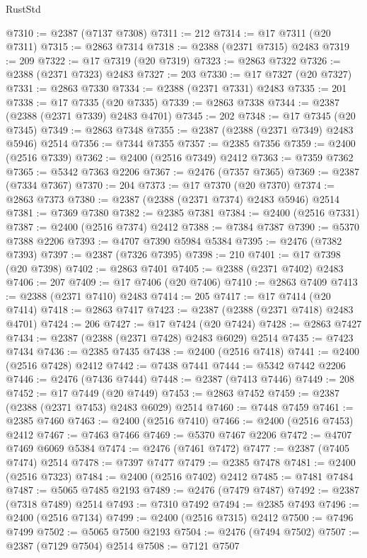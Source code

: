 \begin{lexlean}{RustStd}
\begin{coremodule}
{\begin{coremodule}
{{{{{{{{{{{{{{{{{{{{{{{{{{{{{{{{{{{{{{{{{{{{{{{{{{@7310 := @2387 (@7137 @7308)
@7311 := 212
@7314 := @17 @7311 (@20 @7311)
@7315 := @2863 @7314
@7318 := @2388 (@2371 @7315) @2483
@7319 := 209
@7322 := @17 @7319 (@20 @7319)
@7323 := @2863 @7322
@7326 := @2388 (@2371 @7323) @2483
@7327 := 203
@7330 := @17 @7327 (@20 @7327)
@7331 := @2863 @7330
@7334 := @2388 (@2371 @7331) @2483
@7335 := 201
@7338 := @17 @7335 (@20 @7335)
@7339 := @2863 @7338
@7344 := @2387 (@2388 (@2371 @7339) @2483 @4701)
@7345 := 202
@7348 := @17 @7345 (@20 @7345)
@7349 := @2863 @7348
@7355 := @2387 (@2388 (@2371 @7349) @2483 @5946) @2514
@7356 := @7344 @7355
@7357 := @2385 @7356
@7359 := @2400 (@2516 @7339)
@7362 := @2400 (@2516 @7349) @2412
@7363 := @7359 @7362
@7365 := @5342 @7363 @2206
@7367 := @2476 (@7357 @7365)
@7369 := @2387 (@7334 @7367)
@7370 := 204
@7373 := @17 @7370 (@20 @7370)
@7374 := @2863 @7373
@7380 := @2387 (@2388 (@2371 @7374) @2483 @5946) @2514
@7381 := @7369 @7380
@7382 := @2385 @7381
@7384 := @2400 (@2516 @7331)
@7387 := @2400 (@2516 @7374) @2412
@7388 := @7384 @7387
@7390 := @5370 @7388 @2206
@7393 := @4707 @7390 @5984 @5384
@7395 := @2476 (@7382 @7393)
@7397 := @2387 (@7326 @7395)
@7398 := 210
@7401 := @17 @7398 (@20 @7398)
@7402 := @2863 @7401
@7405 := @2388 (@2371 @7402) @2483
@7406 := 207
@7409 := @17 @7406 (@20 @7406)
@7410 := @2863 @7409
@7413 := @2388 (@2371 @7410) @2483
@7414 := 205
@7417 := @17 @7414 (@20 @7414)
@7418 := @2863 @7417
@7423 := @2387 (@2388 (@2371 @7418) @2483 @4701)
@7424 := 206
@7427 := @17 @7424 (@20 @7424)
@7428 := @2863 @7427
@7434 := @2387 (@2388 (@2371 @7428) @2483 @6029) @2514
@7435 := @7423 @7434
@7436 := @2385 @7435
@7438 := @2400 (@2516 @7418)
@7441 := @2400 (@2516 @7428) @2412
@7442 := @7438 @7441
@7444 := @5342 @7442 @2206
@7446 := @2476 (@7436 @7444)
@7448 := @2387 (@7413 @7446)
@7449 := 208
@7452 := @17 @7449 (@20 @7449)
@7453 := @2863 @7452
@7459 := @2387 (@2388 (@2371 @7453) @2483 @6029) @2514
@7460 := @7448 @7459
@7461 := @2385 @7460
@7463 := @2400 (@2516 @7410)
@7466 := @2400 (@2516 @7453) @2412
@7467 := @7463 @7466
@7469 := @5370 @7467 @2206
@7472 := @4707 @7469 @6069 @5384
@7474 := @2476 (@7461 @7472)
@7477 := @2387 (@7405 @7474) @2514
@7478 := @7397 @7477
@7479 := @2385 @7478
@7481 := @2400 (@2516 @7323)
@7484 := @2400 (@2516 @7402) @2412
@7485 := @7481 @7484
@7487 := @5065 @7485 @2193
@7489 := @2476 (@7479 @7487)
@7492 := @2387 (@7318 @7489) @2514
@7493 := @7310 @7492
@7494 := @2385 @7493
@7496 := @2400 (@2516 @7134)
@7499 := @2400 (@2516 @7315) @2412
@7500 := @7496 @7499
@7502 := @5065 @7500 @2193
@7504 := @2476 (@7494 @7502)
@7507 := @2387 (@7129 @7504) @2514
@7508 := @7121 @7507
}}}}}}}}}}}}}}}}}}}}}}}}}}}}}}}}}}}}}}}}}}}}}}}}}}
\end{coremodule}}
\end{coremodule}
\end{lexlean}
